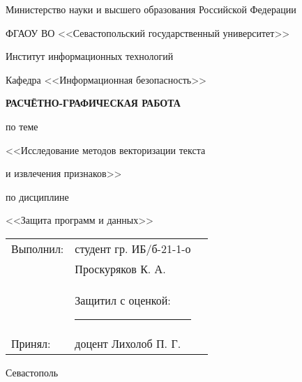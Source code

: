 \documentclass[14pt, a4paper, titlepage]{extarticle}
\begin{document}
    \begin{titlepage}
        \pagestyle{empty}
        \setlength\parindent{0pt}

        \begin{center}
            Министерство науки и высшего образования Российской Федерации
            \par 
            ФГАОУ ВО <<Севастопольский государственный университет>>
            \par
            Институт информационных технологий
        \end{center}

        \bigskip
        \bigskip

        \begin{flushright}
            Кафедра <<Информационная безопасность>>
        \end{flushright}

        \bigskip
        \bigskip
        \bigskip

        \begin{center}
            \textbf{РАСЧЁТНО-ГРАФИЧЕСКАЯ РАБОТА}
            \par
            по теме
            \par
            <<Исследование методов векторизации текста
            \par
            и извлечения признаков>>
            \par
            по дисциплине
            \par
            <<Защита программ и данных>>
        \end{center}

        \bigskip
        \bigskip
        \bigskip
        \bigskip

        \begin{flushright}
            \begin{tabularx}{265pt}{lr@{\quad}X}
                \multicolumn{1}{l}{Выполнил:} & \multicolumn{1}{l}{студент гр. ИБ/б-21-1-о} \\
                                              & \multicolumn{1}{l}{Проскуряков К. А.} \\
                                              & \multicolumn{1}{l}{Защитил с оценкой: \rule{1.2cm}{0.25mm}} \\
                \multicolumn{1}{l}{Принял:}   & \multicolumn{1}{l}{доцент Лихолоб П. Г.}
            \end{tabularx}       
        \end{flushright}

        \begin{center}
            \vfill
            Севастополь
            \par
            \the\year{}
        \end{center}
    \end{titlepage}
\end{document}
